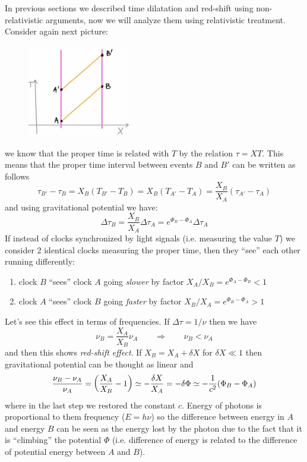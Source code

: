\documentclass[../main/main.tex]{subfiles}
\begin{document}
In previous sections we described time dilatation and red-shift using non-relativistic arguments, now we will analyze them using relativistic treatment.
Consider again next picture:
\begin{figure}[H]
\centering
\includegraphics[width=4.5cm]{../img/T-meaning-Rindler.jpg}
\end{figure}
\noindent we know that the proper time is related with $T$ by the relation $\tau=XT$. This means that the proper time interval between events $B$ and $B'$ can be written as follows
\[\tau_{B'}-\tau_B=X_B(T_{B'}-T_B)=X_B(T_{A'}-T_A)=\frac{X_B}{X_A}(\tau_{A'}-\tau_A)\]
and using gravitational potential we have:
\[\boxed{
\Delta\tau_B=\frac{X_B}{X_A}\Delta\tau_A=e^{\Phi_B-\Phi_A}\Delta\tau_A
}\]
If instead of clocks synchronized by light signals (i.e. measuring the value $T$) we consider 2 identical clocks measuring the proper time, then they ``see'' each other running differently:
\begin{enumerate}[label=\textbullet]
\item clock $B$ ``sees'' clock $A$ going \emph{slower} by factor $X_A/X_B=e^{\Phi_A-\Phi_B}<1$
\item clock $A$ ``sees'' clock $B$ going \emph{faster} by factor $X_B/X_A=e^{\Phi_B-\Phi_A}>1$
\end{enumerate}
Let's see this effect in terms of frequencies. If $\Delta\tau=1/\nu$ then we have
\[\nu_B=\frac{X_A}{X_B}\nu_A\qquad\Rightarrow\qquad\nu_B<\nu_A\]
and then this shows \emph{red-shift effect}. If $X_B=X_A+\delta X$ for $\delta X\ll1$ then gravitational potential can be thought as linear and
\[\frac{\nu_B-\nu_A}{\nu_A}=\left(\frac{X_A}{X_B}-1\right)\simeq-\frac{\delta X}{X_A}=-\delta\Phi\simeq-\frac{1}{c^2}(\Phi_B-\Phi_A)\]
where in the last step we restored the constant $c$.
Energy of photons is proportional to them frequency ($E=h\nu$) so the difference between energy in $A$ and energy $B$ can be seen as the energy lost by the photon due to the fact that it is ``climbing'' the potential $\Phi$ (i.e. difference of energy is related to the difference of potential energy between $A$ and $B$).
\end{document}
